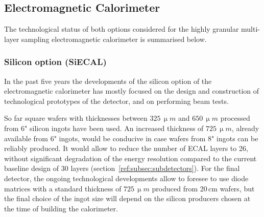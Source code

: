 \subsection{Electromagnetic Calorimeter}
\label{ild:sec:ECAL}
The technological status of both options considered for the highly granular multi-layer sampling electromagnetic calorimeter is summarised below. 

\subsubsection{Silicon option (SiECAL)}

In the past five years the developments of the silicon option of the electromagnetic calorimeter has mostly focused on the design and construction of technological prototypes of the detector, and on performing beam tests. 

So far square wafers with thicknesses between $325\,\upmu m$ and $650\,\upmu m$ processed from 6" silicon ingots have been used. 
An increased thickness of $725\,\upmu m$, already available from 6" ingots, would be conducive in case wafers from 8" ingots can be reliably produced. It would allow to reduce the number of ECAL layers to 26, without significant degradation of the energy resolution compared to the current baseline design of 30 layers (section~\ref{ref:subsec:subdetectors}). For the final detector, the ongoing technological developments allow to foresee to use diode matrices with a standard thickness of $725\,\upmu m$ produced from 20\,cm wafers, but the final choice of the ingot size will depend on the silicon producers chosen at the time of building the calorimeter.



